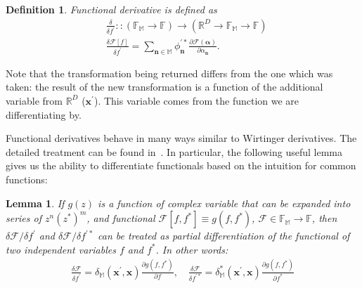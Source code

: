 \documentclass[12pt,aip,jmp,amssymb,amsmath]{revtex4-1}
\newcommand{\nvec}{\boldsymbol{n}}
\newcommand{\xvec}{\boldsymbol{x}}
\newcommand{\balpha}{\boldsymbol{\alpha}}
\newcommand{\restbasis}{\mathbb{M}}
\newtheorem{definition}{Definition}
\newtheorem{lemma}{Lemma}
\begin{document}
\begin{definition}
\label{def:func-calculus:func-diff}
    Functional derivative is defined as
    \begin{equation*}\begin{split}
        & \frac{\delta}{\delta f^\prime} ::
        \left(
            \mathbb{F}_{\restbasis} \rightarrow \mathbb{F}
        \right)
        \rightarrow
        \left(
            \mathbb{R}^D \rightarrow \mathbb{F}_{\restbasis} \rightarrow \mathbb{F}
        \right) \\
        & \frac{\delta \mathcal{F}[f]}{\delta f^\prime}
        = \sum_{\nvec \in \restbasis} \phi_{\nvec}^{\prime*}
            \frac{\partial \mathcal{F}(\balpha)}{\partial \alpha_{\nvec}}.
    \end{split}\end{equation*}
\end{definition}

Note that the transformation being returned differs from the one which was taken: the result of the new transformation is a function of the additional variable from $\mathbb{R}^D$ ($\xvec^\prime$).
This variable comes from the function we are differentiating by.

Functional derivatives behave in many ways similar to Wirtinger derivatives.
The detailed treatment can be found in~\cite{Dalton2011}.
In particular, the following useful lemma gives us the ability to differentiate functionals based on the intuition for common functions:

\begin{lemma}
    If $g(z)$ is a function of complex variable that can be expanded into series of $z^n (z^*)^m$, and functional $\mathcal{F}[f, f^*] \equiv g(f, f^*)$, $\mathcal{F} \in \mathbb{F}_{\restbasis} \rightarrow \mathbb{F}$, then $\delta \mathcal{F} / \delta f^\prime$ and $\delta \mathcal{F} / \delta f^{\prime*}$ can be treated as partial differentiation of the functional of two independent variables $f$ and $f^*$.
    In other words:
    \begin{equation*}\begin{split}
        \frac{\delta \mathcal{F}}{\delta f^\prime}
        = \delta_{\restbasis}(\xvec^\prime, \xvec)
            \frac{\partial g(f, f^*)}{\partial f},
        \quad
        \frac{\delta \mathcal{F}}{\delta f^{\prime*}}
        = \delta_{\restbasis}^*(\xvec^\prime, \xvec)
            \frac{\partial g(f, f^*)}{\partial f^*}
    \end{split}\end{equation*}
\end{lemma}
\end{document}
